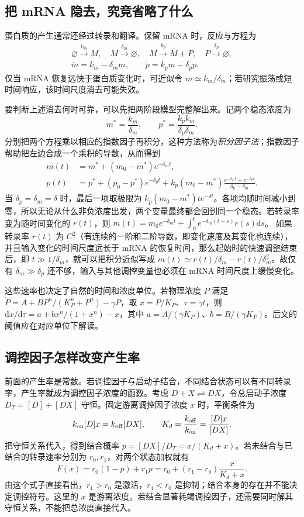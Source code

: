 \documentclass[11pt,a4paper,UTF8,fontset=fandol]{ctexart}
\newcommand{\dd}{\mathrm d}\newcommand{\R}{\mathbb R}\newcommand{\ssv}{\mathrm{ss}}
\begin{document}
\subsection{把 mRNA 隐去，究竟省略了什么}
蛋白质的产生通常还经过转录和翻译。保留 mRNA 时，反应与方程为
\begin{align}
\varnothing\xrightarrow{k_m}M,\quad M\xrightarrow{\delta_m}\varnothing,\quad M\xrightarrow{k_p}M+P,\quad P\xrightarrow{\delta_p}\varnothing,\\[-2pt]
\dot m=k_m-\delta_m m,\qquad\dot p=k_pm-\delta_p p.
\end{align}
仅当 mRNA 恢复远快于蛋白质变化时，可近似令 $m\simeq k_m/\delta_m$；若研究振荡或短时间响应，该时间尺度消去可能失效。

要判断上述消去何时可靠，可以先把两阶段模型完整解出来。记两个稳态浓度为
\[
m^*=\frac{k_m}{\delta_m},\qquad p^*=\frac{k_pk_m}{\delta_p\delta_m}.
\]
分别把两个方程乘以相应的指数因子再积分，这种方法称为\emph{积分因子法}；指数因子帮助把左边合成一个乘积的导数，从而得到
\begin{align}
m(t)&=m^*+(m_0-m^*)e^{-\delta_mt},\\
p(t)&=p^*+(p_0-p^*)e^{-\delta_pt}
 +k_p(m_0-m^*)\frac{e^{-\delta_mt}-e^{-\delta_pt}}{\delta_p-\delta_m}.
\end{align}
当 $\delta_p=\delta_m=\delta$ 时，最后一项取极限为 $k_p(m_0-m^*)te^{-\delta t}$。各项均随时间减小到零，所以无论从什么非负浓度出发，两个变量最终都会回到同一个稳态。若转录率变为随时间变化的 $r(t)$，则
$m(t)=m_0e^{-\delta_mt}+\int_0^t e^{-\delta_m(t-s)}r(s)\dd s$。
如果转录率 $r(t)$ 为 $C^2$（有连续的一阶和二阶导数，即变化速度及其变化也连续），并且输入变化的时间尺度远长于 mRNA 的恢复时间，那么起始时的快速调整结束后，即 $t\gg1/\delta_m$，就可以把积分近似写成
$m(t)\simeq r(t)/\delta_m-\dot r(t)/\delta_m^2$。故仅有 $\delta_m\gg\delta_p$ 还不够，输入与其他调控变量也必须在 mRNA 时间尺度上缓慢变化。

这些速率也决定了自然的时间和浓度单位。若物理浓度 $P$ 满足 $\dot P=A+B P^n/(K_P^n+P^n)-\gamma P$，取 $x=P/K_P$、$\tau=\gamma t$，则
$\dd x/\dd\tau=a+b x^n/(1+x^n)-x$，其中 $a=A/(\gamma K_P)$、$b=B/(\gamma K_P)$。后文的阈值应在对应单位下解读。

\subsection{调控因子怎样改变产生率}
前面的产生率是常数。若调控因子与启动子结合，不同结合状态可以有不同转录率，产生率就成为调控因子浓度的函数。考虑 $D+X\rightleftharpoons DX$，令总启动子浓度 $D_T=[D]+[DX]$ 守恒。固定游离调控因子浓度 $x$ 时，平衡条件为
\[
k_{\rm on}[D]x=k_{\rm off}[DX],\qquad K_d=\frac{k_{\rm off}}{k_{\rm on}}=\frac{[D]x}{[DX]}.
\]
把守恒关系代入，得到结合概率 $p=[DX]/D_T=x/(K_d+x)$。若未结合与已结合的转录速率分别为 $r_0,r_1$，对两个状态加权就有
\begin{equation}F(x)=r_0(1-p)+r_1p=r_0+(r_1-r_0)\frac{x}{K_d+x}.\label{eq:occupancy}\end{equation}
由这个式子直接看出，$r_1>r_0$ 是激活，$r_1<r_0$ 是抑制；结合本身的存在并不能决定调控符号。这里的 $x$ 是游离浓度。若结合显著耗竭调控因子，还需要同时解其守恒关系，不能把总浓度直接代入。
\end{document}

